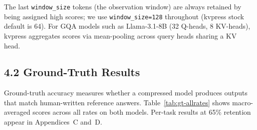 \documentclass[10pt,letterpaper]{article}
\begin{document}
The last \texttt{window\_size} tokens (the observation window) are
always retained by being assigned high scores; we use
\texttt{window\_size=128} throughout (kvpress stock default is 64). For
GQA models such as Llama-3.1-8B (32 Q-heads, 8 KV-heads), kvpress
aggregates scores via mean-pooling across query heads sharing a KV head.

\hypertarget{gt-evaluation}{%
\subsection{4.2 Ground-Truth Results}\label{gt-evaluation}}

Ground-truth accuracy measures whether a compressed model produces outputs
that match human-written reference answers. Table~\ref{tab:gt-allrates} shows macro-averaged scores
across all rates on both models.
Per-task results at 65\% retention appear in Appendices~C and~D.
\end{document}

